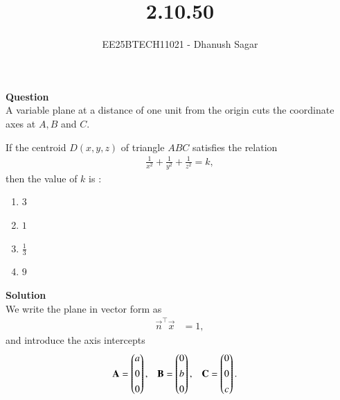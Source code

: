 \documentclass[journal]{IEEEtran}
\begin{document}



\title{2.10.50}
\author{EE25BTECH11021 - Dhanush Sagar
}
{\let\newpage\relax\maketitle}

\renewcommand{\thefigure}{\theenumi}
\renewcommand{\thetable}{\theenumi}
\setlength{\intextsep}{10pt} %


\renewcommand{\thetable}{\theenumi}


\textbf{Question} \\
A variable plane at a distance of one unit from the origin cuts the coordinate axes at $A, B$ and $C$.  


If the centroid $D(x,y,z)$ of triangle $ABC$ satisfies the relation  
\begin{align*}
\frac{1}{x^{2}} + \frac{1}{y^{2}} + \frac{1}{z^{2}} = k,
\end{align*}
then the value of $k$ is :  

\begin{multicols}{2}
\begin{enumerate}
   \item $3$
    \item $1$
    \item $\tfrac{1}{3}$
    \item $9$
\end{enumerate}
\end{multicols}

\textbf{Solution} \\
We write the plane in vector form as
\begin{align}
\vec{n}^{\top}\vec{x} &= 1,
\end{align}
and introduce the axis intercepts
\begin{align}
\mathbf{A} &= \begin{pmatrix}a\\[4pt]0\\[4pt]0\end{pmatrix}, & 
\mathbf{B} &= \begin{pmatrix}0\\[4pt]b\\[4pt]0\end{pmatrix}, &
\mathbf{C} &= \begin{pmatrix}0\\[4pt]0\\[4pt]c\end{pmatrix}.
\end{align}
\end{document}
